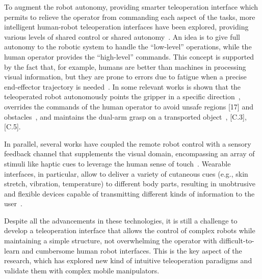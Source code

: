 To augment the robot autonomy, providing smarter teleoperation interface which permits to relieve the operator from commanding each aspect of the tasks, more intelligent human-robot teleoperation interfaces have been explored, providing various levels of shared control or shared autonomy~\cite{Selvaggio2021}. An idea is to give full autonomy to the robotic system to handle the \enquote{low-level} operations, while the human operator provides the \enquote{high-level} commands. This concept is supported by the fact that, for example, humans are better than machines in processing visual information, but they are prone to errors due to fatigue when a precise end-effector trajectory is needed~\cite{Yang2018}⁠. In some relevant works is shown that the teleoperated robot autonomously points the gripper in a specific direction~\cite{Abi2016}, overrides the commands of the human operator to avoid unsafe regions [17] and obstacles~\cite{Masone2018}, and maintains the dual-arm grasp on a transported object~\cite{Shahbazi2017, Laghi2018}, [C.3], [C.5].

In parallel, several works have coupled the remote robot control with a sensory feedback channel that supplements the visual domain, encompassing an array of stimuli like haptic cues to leverage the human sense of touch~\cite{Dargahi2004, Pacchierotti2015}. Wearable interfaces, in particular, allow to deliver a variety of cutaneous cues (e.g., skin stretch, vibration, temperature) to different body parts, resulting in unobtrusive and flexible devices capable of transmitting different kinds of information to the user~\cite{pacchierotti2017wearable}. 
%

Despite all the advancements in these technologies, it is still a challenge to develop a teleoperation interface that allows the control of complex robots while maintaining a simple structure, not overwhelming the operator with difficult-to-learn and cumbersome human robot interfaces. This is the key aspect of the research, which has explored new kind of intuitive teleoperation paradigms and validate them with complex mobile manipulators.